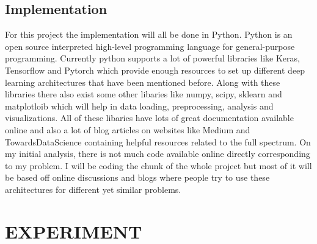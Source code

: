 \documentclass[letterpaper, 12 pt, conference]{ieeeconf}  %
\begin{document}
\subsection{Implementation}
For this project the implementation will all be done in Python. Python is an open source interpreted high-level programming language for general-purpose programming. Currently python supports a lot of powerful libraries like Keras, Tensorflow and Pytorch which provide enough resources to set up different deep learning architectures that have been mentioned before. Along with these libraries there also exist some other libaries like numpy, scipy, sklearn and matplotloib which will help in data loading, preprocessing, analysis and visualizations. All of these libaries have lots of great documentation available online and also a lot of blog articles on websites like Medium and TowardsDataScience containing helpful resources related to the full spectrum. On my initial analysis, there is not much code available online directly corresponding to my problem. I will be coding the chunk of the whole project but most of it will be based off online discussions and blogs where people try to use these architectures for different yet similar problems.

\section{EXPERIMENT}
\end{document}
